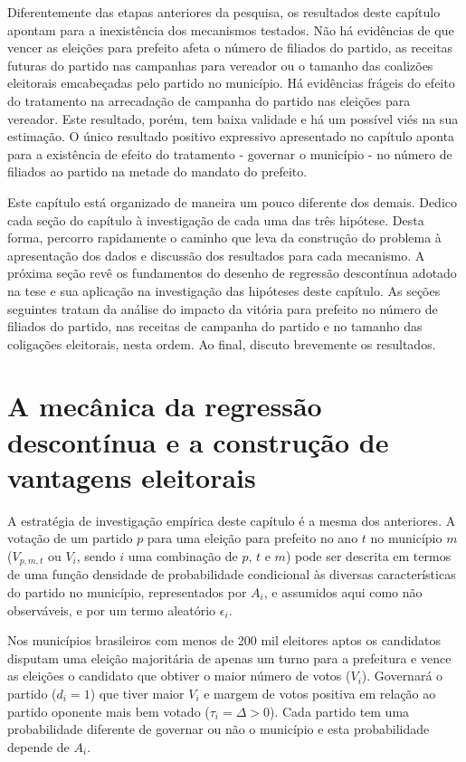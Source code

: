 Diferentemente das etapas anteriores da pesquisa, os resultados deste capítulo apontam para a inexistência dos mecanismos testados. Não há evidências de que vencer as eleições para prefeito afeta o número de filiados do partido, as receitas futuras do partido nas campanhas para vereador ou o tamanho das coalizões eleitorais emcabeçadas pelo partido no município. Há evidências frágeis do efeito do tratamento na arrecadação de campanha do partido nas eleições para vereador. Este resultado, porém, tem baixa validade e há um possível viés na sua estimação. O único resultado positivo expressivo apresentado no capítulo aponta para a existência de efeito do tratamento - governar o município - no número de filiados ao partido na metade do mandato do prefeito.

Este capítulo está organizado de maneira um pouco diferente dos demais. Dedico cada seção do capítulo à investigação de cada uma das três hipótese. Desta forma, percorro rapidamente o caminho que leva da construção do problema à apresentação dos dados e discussão dos resultados para cada mecanismo. A próxima seção revê os fundamentos do desenho de regressão descontínua adotado na tese e sua aplicação na investigação das hipóteses deste capítulo. As seções seguintes tratam da análise do impacto da vitória para prefeito no número de filiados do partido, nas receitas de campanha do partido e no tamanho das coligações eleitorais, nesta ordem. Ao final, discuto brevemente os resultados.

\section{A mecânica da regressão descontínua e a construção de vantagens eleitorais}

A estratégia de investigação empírica deste capítulo é a mesma dos anteriores. A votação de um partido $p$ para uma eleição para prefeito no ano $t$ no município $m$ ($V_{p,m,t}$ ou $V_{i}$, sendo $i$ uma combinação de $p$, $t$ e $m$) pode ser descrita em termos de uma função densidade de probabilidade condicional às diversas características do partido no município, representados por $A_{i}$, e assumidos aqui como não observáveis, e por um termo aleatório $\epsilon_{i}$. 

Nos municípios brasileiros com menos de 200 mil eleitores aptos os candidatos disputam uma eleição majoritária de apenas um turno para a prefeitura e vence as eleições o candidato que obtiver o maior número de votos ($V_{i}$). Governará o partido ($d_{i}=1$) que tiver maior $V_{i}$ e margem de votos positiva em relação ao partido oponente mais bem votado ($\tau_{i}=\Delta>0$). Cada partido tem uma probabilidade diferente de governar ou não o município e esta probabilidade depende de $A_{i}$.

